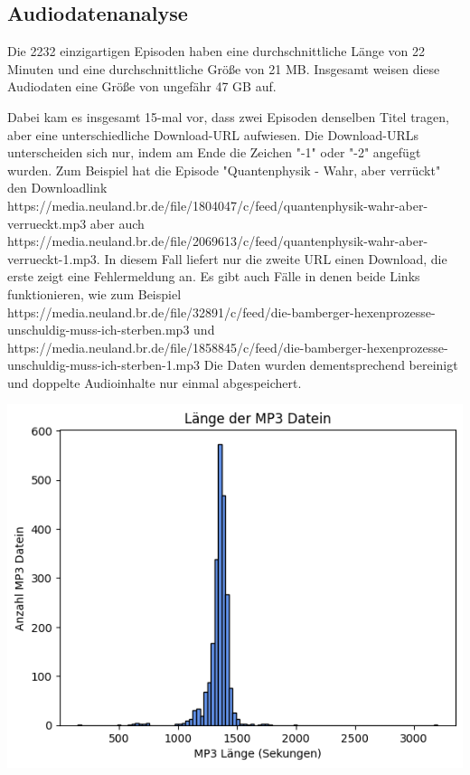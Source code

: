 \subsection{Audiodatenanalyse}


Die 2232 einzigartigen Episoden haben eine durchschnittliche Länge von 22 Minuten und eine durchschnittliche Größe von 21 MB.
Insgesamt weisen diese Audiodaten eine Größe von ungefähr 47 GB auf. 

Dabei kam es insgesamt 15-mal vor, dass zwei Episoden denselben Titel tragen, aber eine unterschiedliche Download-URL aufwiesen.
Die Download-URLs unterscheiden sich nur, indem am Ende die Zeichen "-1" oder "-2" angefügt wurden.
Zum Beispiel hat die Episode "Quantenphysik - Wahr, aber verrückt" den Downloadlink https://media.neuland.br.de/file/1804047/c/feed/quantenphysik-wahr-aber-verrueckt.mp3 aber auch https://media.neuland.br.de/file/2069613/c/feed/quantenphysik-wahr-aber-verrueckt-1.mp3.
In diesem Fall liefert nur die zweite URL einen Download, die erste zeigt eine Fehlermeldung an.
Es gibt auch Fälle in denen beide Links funktionieren, wie zum Beispiel 
https://media.neuland.br.de/file/32891/c/feed/die-bamberger-hexenprozesse-unschuldig-muss-ich-sterben.mp3 und
https://media.neuland.br.de/file/1858845/c/feed/die-bamberger-hexenprozesse-unschuldig-muss-ich-sterben-1.mp3 
Die Daten wurden dementsprechend bereinigt und doppelte Audioinhalte nur einmal abgespeichert.



\includegraphics[width=\linewidth]{figures/mp3_length.png}

